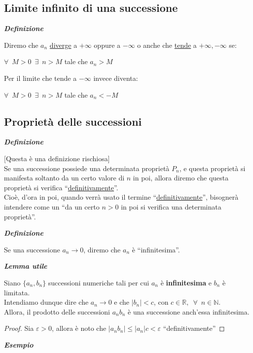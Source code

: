 \documentclass{article}
\theoremstyle{definition}
\newcommand{\virgolette}[1]{``#1''}
\begin{document}
\subsection{Limite infinito di una successione}
\begin{center}
    \textbf{\textit{Definizione}}
\end{center}
Diremo che $a_n$ \underline{diverge} a $+\infty$ oppure a $-\infty$ o anche che \underline{tende} a $+\infty,-\infty$ se:
\\
\begin{center}
    $\forall \,\,\, M>0 \,\,\, \exists \,\,\, n>M$ tale che $a_n>M$
\end{center}
Per il limite che tende a $-\infty$ invece diventa:
\begin{center}
    $\forall \,\,\, M>0 \,\,\, \exists \,\,\, n>M$ tale che $a_n<-M$
\end{center}

\newpage
\subsection{Proprietà delle successioni}
\begin{center}
\textbf{\textit{Definizione}}
\end{center}
[Questa è una definizione rischiosa]
\\
Se una successione possiede una determinata proprietà $P_n$, e questa proprietà si manifesta soltanto da un certo valore di $n$ in poi, allora diremo che questa proprietà si verifica \virgolette{\underline{definitivamente}}.
\\
Cioè, d'ora in poi, quando verrà usato il termine \virgolette{\underline{definitivamente}}, bisognerà intendere come un \virgolette{da un certo $n > 0 $ in poi si verifica una determinata proprietà}.
    


\begin{center}
\textbf{\textit{Definizione}}
\end{center}

    Se una successione $a_n \longrightarrow 0$, diremo che $a_n$ è \virgolette{infinitesima}.
\begin{center}
\textbf{\textit{Lemma utile}}
\end{center}
    Siano $\{a_n,b_n\}$ successioni numeriche tali per cui $a_n$ è \textbf{infinitesima} e $b_n$ è limitata.
    \\
    Intendiamo dunque dire che $a_n \longrightarrow 0$ e che $|b_n|< c$, con $c \in \mathbb{R}, \,\,\, \forall \,\,\, n \in \mathbb{N}$.
    \\
    Allora, il prodotto delle successioni $a_nb_n$ è una successione anch'essa infinitesima.
\begin{proof}
    Sia $\varepsilon>0$, allora è noto che $|a_nb_n|\leqslant|a_n|c< \varepsilon$ \virgolette{definitivamente}
\end{proof}
\begin{center}
\textbf{\textit{Esempio}}
\end{center}
\end{document}
